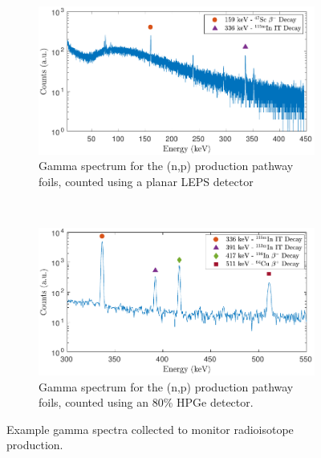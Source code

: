 \documentclass[5p]{elsarticle}
\begin{document}
\begin{figure}[H]
    \centering
    \begin{subfigure}[t]{\textwidth}
        \centering
        \includegraphics[width=5in]{./figures/47sc_gspectrum_alt.pdf}
        \caption{ Gamma spectrum for the (n,p) production pathway foils, counted using a planar LEPS detector}
        \label{fig:spectra_a}
    \end{subfigure}%
    \\
    \begin{subfigure}[t]{\textwidth}
        \centering
        \includegraphics[width=5in]{./figures/64Cu_gspectrum_alt.pdf}
        \caption{Gamma spectrum for the (n,p) production pathway foils, counted using an 80\% HPGe detector.}
                \label{fig:spectra_b}
    \end{subfigure}
    \caption{Example gamma spectra collected to monitor radioisotope production.}
     \label{fig:main_spectra}
\end{figure}
\end{document}
